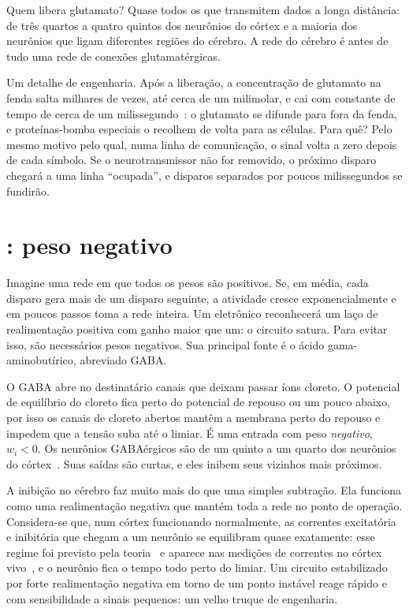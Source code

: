 Quem libera glutamato? Quase todos os que transmitem dados a longa distância: de três quartos a quatro quintos dos neurônios do córtex e a maioria dos neurônios que ligam diferentes regiões do cérebro. A rede do cérebro é antes de tudo uma rede de conexões glutamatérgicas.

Um detalhe de engenharia. Após a liberação, a concentração de glutamato na fenda salta milhares de vezes, até cerca de um milimolar, e cai com constante de tempo de cerca de um milissegundo~\cite{Clements1992}: o glutamato se difunde para fora da fenda, e proteínas-bomba especiais o recolhem de volta para as células. Para quê? Pelo mesmo motivo pelo qual, numa linha de comunicação, o sinal volta a zero depois de cada símbolo. Se o neurotransmissor não for removido, o próximo disparo chegará a uma linha ``ocupada'', e disparos separados por poucos milissegundos se fundirão.

\section{: peso negativo}

Imagine uma rede em que todos os pesos são positivos. Se, em média, cada disparo gera mais de um disparo seguinte, a atividade cresce exponencialmente e em poucos passos toma a rede inteira. Um eletrônico reconhecerá um laço de realimentação positiva com ganho maior que um: o circuito satura. Para evitar isso, são necessários pesos negativos. Sua principal fonte é o ácido gama-aminobutírico, abreviado GABA.

O GABA abre no destinatário canais que deixam passar íons cloreto. O potencial de equilíbrio do cloreto fica perto do potencial de repouso ou um pouco abaixo, por isso os canais de cloreto abertos mantêm a membrana perto do repouso e impedem que a tensão suba até o limiar. É uma entrada com peso \emph{negativo}, $w_i<0$. Os neurônios GABAérgicos são de um quinto a um quarto dos neurônios do córtex~\cite{Hendry1987}. Suas saídas são curtas, e eles inibem seus vizinhos mais próximos.

A inibição no cérebro faz muito mais do que uma simples subtração. Ela funciona como uma realimentação negativa que mantém toda a rede no ponto de operação. Considera-se que, num córtex funcionando normalmente, as correntes excitatória e inibitória que chegam a um neurônio se equilibram quase exatamente: esse regime foi previsto pela teoria~\cite{vanVreeswijk1996} e aparece nas medições de correntes no córtex vivo~\cite{Haider2006}, e o neurônio fica o tempo todo perto do limiar. Um circuito estabilizado por forte realimentação negativa em torno de um ponto instável reage rápido e com sensibilidade a sinais pequenos: um velho truque de engenharia.

